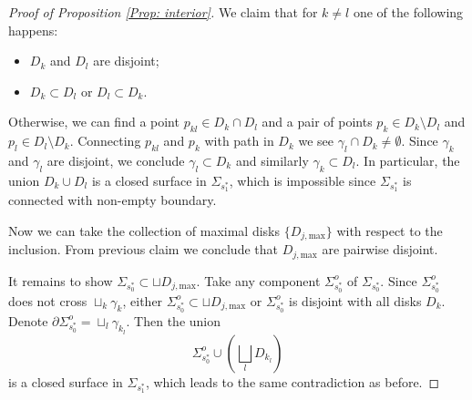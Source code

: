 \documentclass[11pt, reqno]{amsart}
\numberwithin{equation}{section}
\theoremstyle{definition}
\begin{document}
\begin{proof}[Proof of Proposition \ref{Prop: interior}]
We claim that for $k\neq l$ one of the following happens:
\begin{itemize}\setlength{\itemsep}{1mm}
\item $D_k$ and $D_l$ are disjoint;
\item $D_k\subset D_l$ or $D_l\subset D_k$.
\end{itemize}
Otherwise, we can find a point $p_{kl}\in D_k\cap D_l$ and a pair of points $p_k\in D_k\setminus D_l$ and $p_l\in D_l\setminus D_k$. Connecting $p_{kl}$ and $p_k$ with path in $D_k$ we see $\gamma_l\cap D_k\neq\emptyset$. Since $\gamma_k$ and $\gamma_l$ are disjoint, we conclude $\gamma_l\subset D_k$ and similarly $\gamma_k\subset D_l$. In particular, the union $D_k\cup D_l$ is a closed surface in $\Sigma_{s_1^*}$, which is impossible since $\Sigma_{s_1^*}$ is connected with non-empty boundary.

Now we can take the collection of maximal disks $\{D_{j,\mathrm{max}}\}$ with respect to the inclusion. From previous claim we conclude that $D_{j,\mathrm{max}}$ are pairwise disjoint.

It remains to show $\Sigma_{s_0^*}\subset \sqcup D_{j,\mathrm{max}}$. Take any component $\Sigma_{s_0^*}^o$ of $\Sigma_{s_0^*}$. Since $\Sigma_{s_0^*}^o$ does not cross $\sqcup_k\gamma_k$, either $\Sigma_{s_0^*}^o\subset \sqcup D_{j,\mathrm{max}}$ or $\Sigma_{s_0^*}^o$ is disjoint with all disks $D_k$. Denote $\partial\Sigma_{s_0^*}^o=\sqcup_l \gamma_{k_l}$. Then the union
$$
\Sigma_{s_0^*}^o\cup\left(\bigsqcup_lD_{k_l}\right)
$$
is a closed surface in $\Sigma_{s_1^*}$, which leads to the same contradiction as before.



\end{proof}
\end{document}
